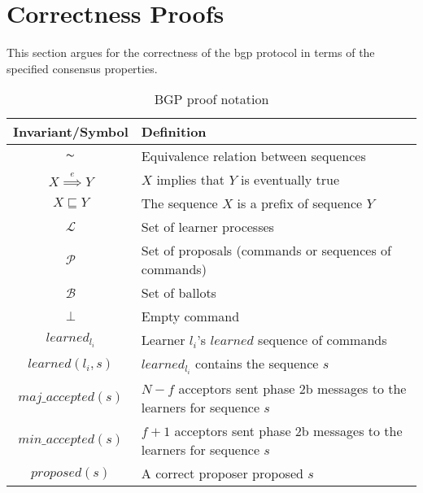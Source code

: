 \section{Correctness Proofs} \label{bft_proof}

This section argues for the correctness of the \acrlong{bgp} protocol in terms of the specified consensus properties.\par

\begin{table}[h!]
	\renewcommand{\arraystretch}{1.5}
	\centering
	\begin{tabularx}{\linewidth}{ |c|X|}
		\hline
		Invariant/Symbol & Definition \\
		\hline
		$\thicksim$ & Equivalence relation between sequences \\
		\hline
		$X \overset{e}{\implies} Y$ & $X$ implies that $Y$ is eventually true \\
		\hline
		$X \sqsubseteq Y$ & The sequence $X$ is a prefix of sequence $Y$ \\
		\hline
		$\mathcal{L}$ & Set of learner processes \\
		\hline
		$\mathcal{P}$ & Set of proposals (commands or sequences of commands) \\
		\hline
		$\mathcal{B}$ & Set of ballots \\
		\hline
		$\bot$ & Empty command \\
		\hline		
		$learned_{l_i}$ & Learner $l_i$'s $learned$ sequence of commands \\
		\hline
		$learned(l_i,s)$ & $learned_{l_i}$ contains the sequence $s$ \\
		\hline
		$maj\_accepted(s)$ & $N-f$ acceptors sent phase 2b messages to the learners for sequence $s$ \\
		\hline
		$min\_accepted(s)$ & $f+1$ acceptors sent phase 2b messages to the learners for sequence $s$ \\
		\hline
		$proposed(s)$ & A correct proposer proposed $s$ \\
		\hline
		
	\end{tabularx} 
	\vspace{\smallskipamount}
	\caption{BGP proof notation} 
	\label{table:bft_proof}
\end{table}

